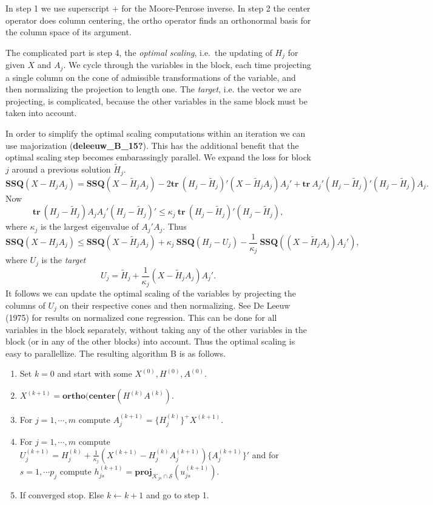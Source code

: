 \documentclass[
  12pt,
  letterpaper,
  DIV=11,
  numbers=noendperiod]{scrreprt}
\providecommand{\tightlist}{%
  \setlength{\itemsep}{0pt}\setlength{\parskip}{0pt}}
\begin{document}
In step 1 we use superscript + for the Moore-Penrose inverse. In step 2
the center operator does column centering, the ortho operator finds an
orthonormal basis for the column space of its argument.

The complicated part is step 4, the \emph{optimal scaling}, i.e.~the
updating of \(H_j\) for given \(X\) and \(A_j\). We cycle through the
variables in the block, each time projecting a single column on the cone
of admissible transformations of the variable, and then normalizing the
projection to length one. The \emph{target}, i.e. the vector we are
projecting, is complicated, because the other variables in the same
block must be taken into account.

In order to simplify the optimal scaling computations within an
iteration we can use majorization (\textbf{deleeuw\_B\_15?}). This has
the additional benefit that the optimal scaling step becomes
embarassingly parallel. We expand the loss for block \(j\) around a
previous solution \(\tilde H_j\). \[
  \mathbf{SSQ}(X-H_jA_j)=
  \mathbf{SSQ}(X-\tilde H_jA_j)-2\mathbf{tr}\ (H_j-\tilde H_j)'(X-\tilde H_jA_j)A_j'
  +\mathbf{tr}\ A_j'(H_j-\tilde H_j)'(H_j-\tilde H_j)A_j.
\] Now \[
  \mathbf{tr}\ (H_j-\tilde H_j)A_jA_j'(H_j-\tilde H_j)'\leq\kappa_j\ \mathbf{tr}\ (H_j-\tilde H_j)'(H_j-\tilde H_j),
\] where \(\kappa_j\) is the largest eigenvalue of \(A_j'A_j\). Thus \[
  \mathbf{SSQ}(X-H_jA_j)\leq\mathbf{SSQ}(X-\tilde H_jA_j)+\kappa_j\ \mathbf{SSQ}(H_j-U_j)-\frac{1}{\kappa_j}\ \mathbf{SSQ}((X-\tilde H_jA_j)A_j'),
\] where \(U_j\) is the \emph{target} \[
  U_j=\tilde H_j+\frac{1}{\kappa_j}(X-\tilde H_jA_j)A_j'.\tag{3}
\] It follows we can update the optimal scaling of the variables by
projecting the columns of \(U_j\) on their respective cones and then
normalizing. See De Leeuw (1975) for results on normalized cone
regression. This can be done for all variables in the block separately,
without taking any of the other variables in the block (or in any of the
other blocks) into account. Thus the optimal scaling is easy to
parallellize. The resulting algorithm B is as follows.

\begin{enumerate}
\def\labelenumi{\arabic{enumi}.}
\setcounter{enumi}{-1}
\tightlist
\item
  Set \(k=0\) and start with some \(X^{(0)},H^{(0)},A^{(0)}\).
\item
  \(X^{(k+1)}=\mathbf{ortho}(\mathbf{center}(H^{(k)}A^{(k)})\).
\item
  For \(j=1,\cdots,m\) compute \(A_j^{(k+1)}=\{H_j^{(k)}\}^+X^{(k+1)}\).
\item
  For \(j=1,\cdots,m\) compute
  \(U_j^{(k+1)}=H_j^{(k)}+\frac{1}{\kappa_j}(X^{(k+1)}-H_j^{(k)}A_j^{(k+1)})\{A_j^{(k+1)}\}'\)
  and for \(s=1,\cdots p_j\) compute
  \(h_{js}^{(k+1)}=\mathbf{proj}_{\mathcal{K}_{js}\cap\mathcal{S}}(u_{js}^{(k+1)})\).
\item
  If converged stop. Else \(k\leftarrow k+1\) and go to step 1.
\end{enumerate}
\end{document}
